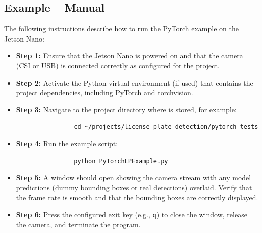 \subsection{Example -- Manual}

The following instructions describe how to run the PyTorch example on the Jetson Nano:

\begin{itemize}
	\item \textbf{Step 1:} Ensure that the Jetson Nano is powered on and that the camera (CSI or USB) is connected correctly as configured for the project.
	\item \textbf{Step 2:} Activate the Python virtual environment (if used) that contains the project dependencies, including PyTorch and torchvision.
	\item \textbf{Step 3:} Navigate to the project directory where  is stored, for example:
	
	\begin{tcolorbox}[colback=white, colframe=black, coltext=ShellColor, sharp corners, boxrule=0.8pt]
		\begin{small}
			\begin{verbatim}
				cd ~/projects/license-plate-detection/pytorch_tests
			\end{verbatim}
		\end{small}
	\end{tcolorbox}
	
	\item \textbf{Step 4:} Run the example script:
	
	\begin{tcolorbox}[colback=white, colframe=black, coltext=ShellColor, sharp corners, boxrule=0.8pt]
		\begin{small}
			\begin{verbatim}
				python PyTorchLPExample.py
			\end{verbatim}
		\end{small}
	\end{tcolorbox}
	
	\item \textbf{Step 5:} A window should open showing the camera stream with any model predictions (dummy bounding boxes or real detections) overlaid. Verify that the frame rate is smooth and that the bounding boxes are correctly displayed.
	\item \textbf{Step 6:} Press the configured exit key (e.g., \texttt{q}) to close the window, release the camera, and terminate the program.
\end{itemize}

